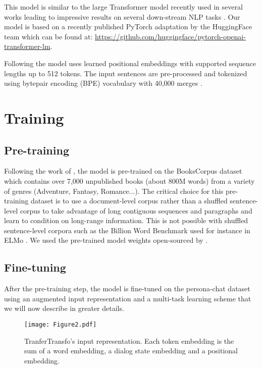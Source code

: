 \documentclass[letterpaper]{article} \usepackage{aaai19}  \usepackage{times}  \usepackage{helvet}  \usepackage{courier}  \usepackage{url}  \usepackage{graphicx}  \usepackage{natbib}
\begin{document}
This model is similar to the large Transformer model recently used in several works leading to impressive results on several down-stream NLP tasks \citep{radford_improving_2018,devlin_bert:_2018}. Our model is based on a recently published PyTorch adaptation by the HuggingFace team which can be found at: \url{https://github.com/huggingface/pytorch-openai-transformer-lm}.

Following \citeauthor{radford_improving_2018,devlin_bert:_2018} the model uses learned positional embeddings with supported sequence lengths up to 512 tokens. The input sentences are pre-processed and tokenized using bytepair encoding (BPE) vocabulary with 40,000 merges \citep{sennrich_neural_2015}.

\section{Training}
\subsection{Pre-training}
Following the work of \citeauthor{radford_improving_2018}, the model is pre-trained on the BooksCorpus dataset \citep{zhu_aligning_2015} which contains over 7,000 unpublished books (about 800M words) from a variety of genres (Adventure, Fantasy, Romance...). The critical choice for this pre-training dataset is to use a document-level corpus rather than a shuffled sentence-level corpus to take advantage of long contiguous sequences and paragraphs and learn to condition on long-range information. This is not possible with shuffled sentence-level corpora such as the Billion Word Benchmark \citep{chelba_one_2013} used for instance in ELMo \citep{peters_deep_2018}. We used the pre-trained model weights open-sourced by \citeauthor{radford_improving_2018}.

\subsection{Fine-tuning}
After the pre-training step, the model is fine-tuned on the {\sc persona-chat} dataset using an augmented input representation and a multi-task learning scheme that we will now describe in greater details.
\begin{figure*}
	\texttt{[image: Figure2.pdf]}
    \caption{TranferTransfo's input representation. Each token embedding is the sum of a word embedding, a dialog state
embedding and a positional embedding.}
    \label{fig:inputs}
\end{figure*}
\end{document}
